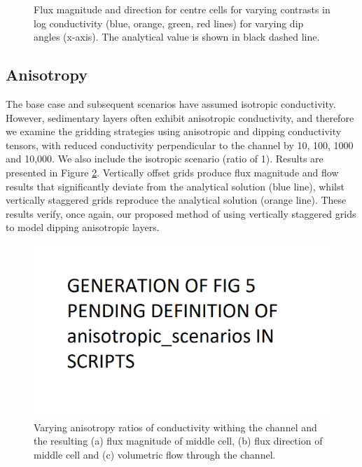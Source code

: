\documentclass{article}
\begin{document}
\begin{figure}[p!]
\caption{Flux magnitude and direction for centre cells for varying contrasts in log conductivity (blue, orange, green, red lines) for varying dip angles (x-axis). The analytical value is shown in black dashed line.}
\label{fig:figures}
\end{figure}

\subsection{Anisotropy}

The base case and subsequent scenarios have assumed isotropic conductivity. However, sedimentary layers often exhibit anisotropic conductivity, and therefore we examine the gridding strategies using anisotropic and dipping conductivity tensors, with reduced conductivity perpendicular to the channel by 10, 100, 1000 and 10,000. We also include the isotropic scenario (ratio of 1). Results are presented in Figure \ref{fig:fig5}. 
Vertically offset grids produce flux magnitude and flow results that significantly deviate from the analytical solution (blue line), whilst vertically staggered grids reproduce the analytical solution (orange line). These results verify, once again, our proposed method of using vertically staggered grids to model dipping anisotropic layers.


\begin{figure}
	\begin{center}
	\includegraphics[scale=0.9]{../figures/fig5paper.png}
	\caption{Varying anisotropy ratios of conductivity withing the channel and the resulting (a) flux magnitude of middle cell, (b) flux direction of middle cell and (c) volumetric flow through the channel. }
	\label{fig:fig5}
	\end{center}
\end{figure}
\end{document}
